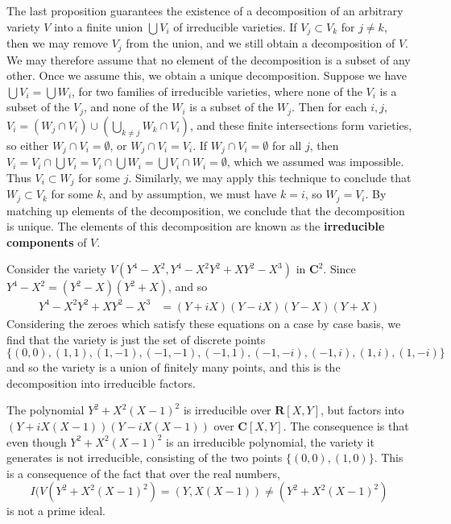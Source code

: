 The last proposition guarantees the existence of a decomposition of an arbitrary variety $V$ into a finite union $\bigcup V_i$ of irreducible varieties. If $V_j \subset V_k$ for $j \neq k$, then we may remove $V_j$ from the union, and we still obtain a decomposition of $V$. We may therefore assume that no element of the decomposition is a subset of any other. Once we assume this, we obtain a unique decomposition. Suppose we have $\bigcup V_i = \bigcup W_i$, for two families of irreducible varieties, where none of the $V_i$ is a subset of the $V_j$, and none of the $W_i$ is a subset of the $W_j$. Then for each $i,j$, $V_i = (W_j \cap V_i) \cup (\bigcup_{k \neq j} W_k \cap V_i)$, and these finite intersections form varieties, so either $W_j \cap V_i = \emptyset$, or $W_j \cap V_i = V_i$. If $W_j \cap V_i = \emptyset$ for all $j$, then $V_i = V_i \cap \bigcup V_i = V_i \cap \bigcup W_i = \bigcup V_i \cap W_i = \emptyset$, which we assumed was impossible. Thus $V_i \subset W_j$ for some $j$. Similarly, we may apply this technique to conclude that $W_j \subset V_k$ for some $k$, and by assumption, we must have $k = i$, so $W_j = V_i$. By matching up elements of the decomposition, we conclude that the decomposition is unique. The elements of this decomposition are known as the {\bf irreducible components} of $V$.

\begin{example}
    Consider the variety $V(Y^4 - X^2, Y^4 - X^2Y^2 + XY^2 - X^3)$ in $\mathbf{C}^2$. Since $Y^4 - X^2 = (Y^2 - X)(Y^2 + X)$, and so
    \begin{align*}
        Y^4 - X^2Y^2 + XY^2 - X^3 &= (Y + iX)(Y - iX)(Y-X)(Y+X)
    \end{align*}
    Considering the zeroes which satisfy these equations on a case by case basis, we find that the variety is just the set of discrete points
    \[ \{ (0,0), (1,1), (1,-1), (-1,-1), (-1,1), (-1,-i), (-1,i), (1,i), (1,-i) \} \]
    and so the variety is a union of finitely many points, and this is the decomposition into irreducible factors.
\end{example}

\begin{example}
    The polynomial $Y^2 + X^2(X-1)^2$ is irreducible over $\mathbf{R}[X,Y]$, but factors into $(Y + iX(X-1))(Y - iX(X-1))$ over $\mathbf{C}[X,Y]$. The consequence is that even though $Y^2 + X^2(X-1)^2$ is an irreducible polynomial, the variety it generates is not irreducible, consisting of the two points $\{ (0,0), (1,0) \}$. This is a consequence of the fact that over the real numbers,
    \[ I(V(Y^2 + X^2(X-1)^2) = (Y,X(X-1)) \neq (Y^2 + X^2(X - 1)^2) \]
    is not a prime ideal.
\end{example}


